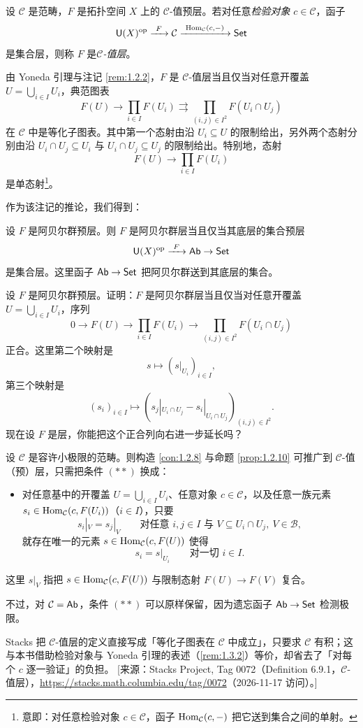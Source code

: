 \begin{definition}\label{def:1.3.1}
设 $\mathcal C$ 是范畴，$F$ 是拓扑空间 $X$ 上的 $\mathcal C$-值预层。若对任意\emph{检验对象} $c\in\mathcal C$，函子
\[
\smallcat U(X)^{\op}\xrightarrow{\ F\ }\mathcal C\xrightarrow{\ \Hom_{\mathcal C}(c,-)\ }\Set
\]
是集合层，则称 $F$ 是\emph{$\mathcal C$-值层}。
\end{definition}

\begin{remark}\label{rem:1.3.2}
由 Yoneda 引理与注记 \ref{rem:1.2.2}，$F$ 是 $\mathcal C$-值层当且仅当对任意开覆盖 $U=\bigcup_{i\in I}U_i$，典范图表
\[
F(U)\to\prod_{i\in I}F(U_i)\rightrightarrows\prod_{(i,j)\in I^2}F(U_i\cap U_j)
\]
在 $\mathcal C$ 中是等化子图表。其中第一个态射由沿 $U_i\subseteq U$ 的限制给出，另外两个态射分别由沿 $U_i\cap U_j\subseteq U_i$ 与 $U_i\cap U_j\subseteq U_j$ 的限制给出。特别地，态射
\[
F(U)\to\prod_{i\in I}F(U_i)
\]
是单态射\footnote{意即：对任意检验对象 $c\in\mathcal C$，函子 $\operatorname{Hom}_{\mathcal C}(c,-)$ 把它送到集合之间的单射。}。
\end{remark}

作为该注记的推论，我们得到：

\begin{corollary}\label{cor:1.3.3}
设 $F$ 是阿贝尔群预层。则 $F$ 是阿贝尔群层当且仅当其底层的集合预层
\[
\smallcat U(X)^{\op}\xrightarrow{\ F\ }\Ab\to\Set
\]
是集合层。这里函子 $\mathsf{Ab}\to\mathsf{Set}$ 把阿贝尔群送到其底层的集合。
\end{corollary}

\begin{exercise}\label{exc:1.3.4}
设 $F$ 是阿贝尔群预层。证明：$F$ 是阿贝尔群层当且仅当对任意开覆盖 $U=\bigcup_{i\in I}U_i$，序列
\[
0\to F(U)\to\prod_{i\in I}F(U_i)\to\prod_{(i,j)\in I^2}F(U_i\cap U_j)
\]
正合。这里第二个映射是
\[
s\mapsto (s|_{U_i})_{i\in I},
\]
第三个映射是
\[
(s_i)_{i\in I}\mapsto (s_j|_{U_i\cap U_j}-s_i|_{U_i\cap U_j})_{(i,j)\in I^2}.
\]
现在设 $F$ 是层，你能把这个正合列向右进一步延长吗？
\end{exercise}

\begin{remark}\label{rem:1.3.5}
设 $\mathcal C$ 是容许小极限的范畴。则构造 \ref{con:1.2.8} 与命题 \ref{prop:1.2.10} 可推广到 $\mathcal C$-值（预）层，只需把条件 $(**)$ 换成：
\begin{itemize}
  \item 对任意基中的开覆盖 $U=\bigcup_{i\in I}U_i$、任意对象 $c\in\mathcal C$，以及任意一族元素 $s_i\in\operatorname{Hom}_{\mathcal C}(c,F(U_i))$（$i\in I$），只要
  \[
  s_i|_V=s_j|_V\qquad\text{对任意 } i,j\in I \text{ 与 } V\subseteq U_i\cap U_j,\ V\in\mathcal B,
  \]
  就存在唯一的元素 $s\in\operatorname{Hom}_{\mathcal C}(c,F(U))$ 使得
  \[
  s_i=s|_{U_i}\qquad\text{对一切 } i\in I.
  \]
\end{itemize}
这里 $s|_V$ 指把 $s\in\operatorname{Hom}_{\mathcal C}(c,F(U))$ 与限制态射 $F(U)\to F(V)$ 复合。

不过，对 $\mathcal C=\mathsf{Ab}$，条件 $(**)$ 可以原样保留，因为遗忘函子 $\mathsf{Ab}\to\mathsf{Set}$ 检测极限。
\end{remark}

\begin{yizhu}
Stacks 把 $\mathcal C$-值层的定义直接写成「等化子图表在 $\mathcal C$ 中成立」，只要求 $\mathcal C$ 有积；这与本书借助检验对象与 Yoneda 引理的表述（\ref{rem:1.3.2}）等价，却省去了「对每个 $c$ 逐一验证」的负担。
[来源：Stacks Project, Tag 0072（Definition 6.9.1，$\mathcal C$-值层），\url{https://stacks.math.columbia.edu/tag/0072}（2026-11-17 访问）。]
\end{yizhu}
